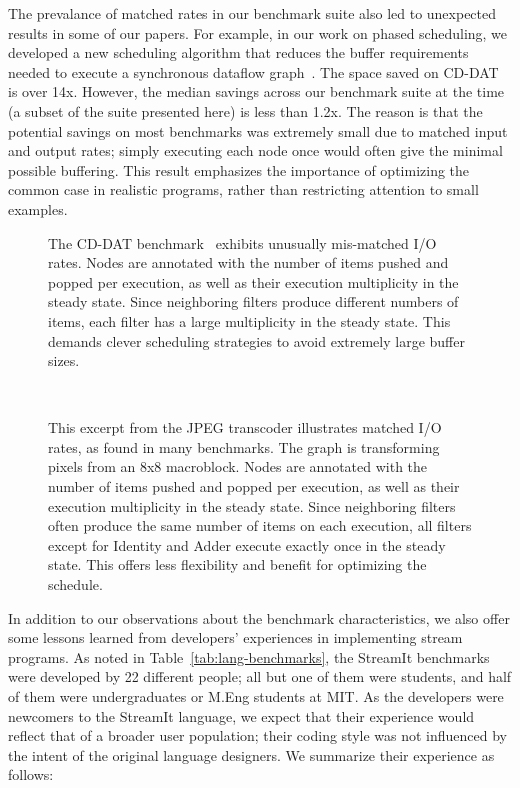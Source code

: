   The prevalance of matched rates in our benchmark suite also led to
  unexpected results in some of our papers.  For example, in our work
  on phased scheduling, we developed a new scheduling algorithm that
  reduces the buffer requirements needed to execute a synchronous
  dataflow graph~\cite{karczmarek-lctes03}.  The space saved on CD-DAT
  is over 14x.  However, the median savings across our benchmark suite
  at the time (a subset of the suite presented here) is less than
  1.2x.  The reason is that the potential savings on most benchmarks
  was extremely small due to matched input and output rates; simply
  executing each node once would often give the minimal possible
  buffering.  This result emphasizes the importance of optimizing the
  common case in realistic programs, rather than restricting attention
  to small examples.

\begin{figure}[t!]
\centering
{}
\vspace{-6pt}
\caption[CD-DAT, an example of mismatched I/O rates]{The CD-DAT
  benchmark~\cite{murthy_buffer_2004} exhibits unusually mis-matched
  I/O rates.  Nodes are annotated with the number of items pushed and
  popped per execution, as well as their execution multiplicity in the
  steady state. Since neighboring filters produce different numbers of
  items, each filter has a large multiplicity in the steady state.
  This demands clever scheduling strategies to avoid extremely large
  buffer sizes.\protect\label{fig:cd-dat}}
~ \\
\vspace{-6pt}
\caption[JPEG transcoder excerpt, an example of matched I/O rates]{This 
excerpt from the JPEG transcoder illustrates matched I/O rates, as
found in many benchmarks.  The graph is transforming pixels from an
8x8 macroblock.  Nodes are annotated with the number of items pushed
and popped per execution, as well as their execution multiplicity in
the steady state.  Since neighboring filters often produce the same
number of items on each execution, all filters except for Identity and
Adder execute exactly once in the steady state.  This offers less
flexibility and benefit for optimizing the
schedule.\protect\label{fig:fft}}
\vspace{-24pt}
\end{figure}

\myend

In addition to our observations about the benchmark characteristics,
we also offer some lessons learned from developers' experiences in
implementing stream programs.  As noted in
Table~\ref{tab:lang-benchmarks}, the StreamIt benchmarks were
developed by 22 different people; all but one of them were students,
and half of them were undergraduates or M.Eng students at MIT.  As the
developers were newcomers to the StreamIt language, we expect that
their experience would reflect that of a broader user population;
their coding style was not influenced by the intent of the original
language designers.  We summarize their experience as follows:

